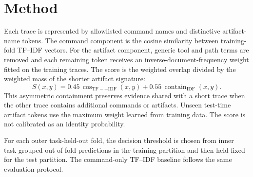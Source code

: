 \section{Method}
\label{sec:method}

Each trace is represented by allowlisted command names and distinctive artifact-name tokens. The command component is the cosine similarity between training-fold TF--IDF vectors. For the artifact component, generic tool and path terms are removed and each remaining token receives an inverse-document-frequency weight fitted on the training traces. The score is the weighted overlap divided by the weighted mass of the shorter artifact signature:
\begin{equation}
\label{eq:pair-score}
S(x,y)=0.45\,\operatorname{cos}_{\mathrm{TF--IDF}}(x,y)
+0.55\,\operatorname{contain}_{\mathrm{IDF}}(x,y).
\end{equation}
This asymmetric containment preserves evidence shared with a short trace when the other trace contains additional commands or artifacts. Unseen test-time artifact tokens use the maximum weight learned from training data. The score is not calibrated as an identity probability.

For each outer task-held-out fold, the decision threshold is chosen from inner task-grouped out-of-fold predictions in the training partition and then held fixed for the test partition. The command-only TF--IDF baseline follows the same evaluation protocol.

